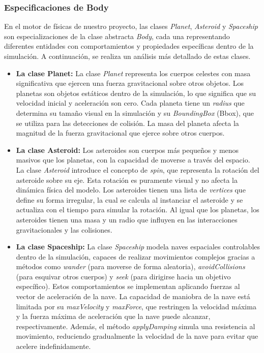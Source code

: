 \subsubsection{Especificaciones de Body}
En el motor de físicas de nuestro proyecto, las clases \textit{Planet}, \textit{Asteroid} y \textit{Spaceship} son especializaciones de la clase abstracta \textit{Body}, cada una representando diferentes entidades con comportamientos y propiedades específicas dentro de la simulación. A continuación, se realiza un análisis más detallado de estas clases.
\begin{itemize}
    \item \textbf{La clase Planet:} La clase \textit{Planet} representa los cuerpos celestes con masa significativa que ejercen una fuerza gravitacional sobre otros objetos. Los planetas son objetos estáticos dentro de la simulación, lo que significa que su velocidad inicial y aceleración son cero. Cada planeta tiene un \textit{radius} que determina su tamaño visual en la simulación y su \textit{BoundingBox} (Bbox), que se utiliza para las detecciones de colisión. La masa del planeta afecta la magnitud de la fuerza gravitacional que ejerce sobre otros cuerpos.
    \item \textbf{La clase Asteroid:} Los asteroides son cuerpos más pequeños y menos masivos que los planetas, con la capacidad de moverse a través del espacio. La clase \textit{Asteroid} introduce el concepto de \textit{spin}, que representa la rotación del asteroide sobre su eje. Esta rotación es puramente visual y no afecta la dinámica física del modelo. Los asteroides tienen una lista de \textit{vertices} que define su forma irregular, la cual se calcula al instanciar el asteroide y se actualiza con el tiempo para simular la rotación. Al igual que los planetas, los asteroides tienen una masa y un radio que influyen en las interacciones gravitacionales y las colisiones.
    \item \textbf{La clase Spaceship:} La clase \textit{Spaceship} modela naves espaciales controlables dentro de la simulación, capaces de realizar movimientos complejos gracias a métodos como \textit{wander} (para moverse de forma aleatoria), \textit{avoidCollisions} (para esquivar otros cuerpos) y \textit{seek} (para dirigirse hacia un objetivo específico). Estos comportamientos se implementan aplicando fuerzas al vector de aceleración de la nave. La capacidad de maniobra de la nave está limitada por su \textit{maxVelocity} y \textit{maxForce}, que restringen la velocidad máxima y la fuerza máxima de aceleración que la nave puede alcanzar, respectivamente. Además, el método \textit{applyDamping} simula una resistencia al movimiento, reduciendo gradualmente la velocidad de la nave para evitar que acelere indefinidamente.
\end{itemize}
